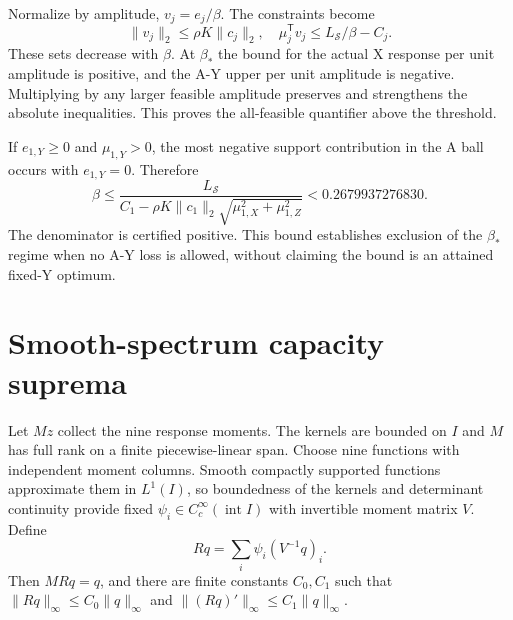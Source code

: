 \documentclass[9pt]{osa-supplemental-document}
\begin{document}
Normalize by amplitude, $v_j=e_j/\beta$. The constraints become
\begin{equation}
 \|v_j\|_2\leq\rho K\|c_j\|_2,\quad
 \mu_j^{\mathsf T}v_j\leq L_{\mathcal S}/\beta-C_j.
\end{equation}
These sets decrease with $\beta$. At $\beta_*$ the bound for the actual X response per unit amplitude is positive, and the A-Y upper per unit amplitude is negative. Multiplying by any larger feasible amplitude preserves and strengthens the absolute inequalities. This proves the all-feasible quantifier above the threshold.

If $e_{1,Y}\geq0$ and $\mu_{1,Y}>0$, the most negative support contribution in the A ball occurs with $e_{1,Y}=0$. Therefore
\begin{equation}
 \beta\leq\frac{L_{\mathcal S}}
 {C_1-\rho K\|c_1\|_2\sqrt{\mu_{1,X}^2+\mu_{1,Z}^2}}
 <0.2679937276830.
\end{equation}
The denominator is certified positive. This bound establishes exclusion of the $\beta_*$ regime when no A-Y loss is allowed, without claiming the bound is an attained fixed-Y optimum.

\section{Smooth-spectrum capacity suprema}
Let $Mz$ collect the nine response moments. The kernels are bounded on $I$ and $M$ has full rank on a finite piecewise-linear span. Choose nine functions with independent moment columns. Smooth compactly supported functions approximate them in $L^1(I)$, so boundedness of the kernels and determinant continuity provide fixed $\psi_i\in C_c^\infty(\operatorname{int}I)$ with invertible moment matrix $V$. Define
\begin{equation}
 Rq=\sum_i\psi_i(V^{-1}q)_i.
\end{equation}
Then $MRq=q$, and there are finite constants $C_0,C_1$ such that $\|Rq\|_\infty\leq C_0\|q\|_\infty$ and $\|(Rq)'\|_\infty\leq C_1\|q\|_\infty$.
\end{document}
